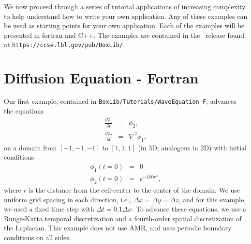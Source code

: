 We now proceed through a series of tutorial applications of increasing complexity
to help understand how to write your own application.  Any of these examples
can be used as starting points for your own application.  Each of the examples
will be presented in fortran and C++.  The examples are contained in the \BoxLib\
release found at {\tt https://ccse.lbl.gov/pub/BoxLib/}.

\section{Diffusion Equation - Fortran}
Our first example, contained in {\tt BoxLib/Tutorials/WaveEquation\_F}, advances the equations
\begin{eqnarray}
\frac{\partial\phi_1}{\partial t} &=& \phi_2, \\
\frac{\partial\phi_2}{\partial t} &=& \nabla^2\phi_1,
\end{eqnarray}
on a domain from $[-1,-1,-1]$ to $[1,1,1]$ (in 3D; analogous in 2D) with initial conditions
\begin{eqnarray}
\phi_1(t=0) &=& 0 \\
\phi_2(t=0) &=& e^{-100r^2},
\end{eqnarray}
where $r$ is the distance from the cell-center to the center of the domain.
We use uniform grid spacing in each direction, i.e., $\Delta x = \Delta y = \Delta z$,
and for this example, we used a fixed time step with $\Delta t = 0.1\Delta x$.
To advance these equations, we use a Runge-Kutta temporal discretization and a 
fourth-order spatial discretization of the Laplacian.  This example does not use AMR, 
and uses periodic boundary conditions on all sides.

